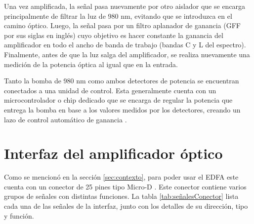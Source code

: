 
Una vez amplificada, la señal pasa nuevamente por otro aislador que se encarga principalmente de filtrar la luz de 980 nm, evitando que se introduzca en el camino óptico. Luego, la señal pasa por un filtro aplanador de ganancia (GFF por sus siglas en inglés) cuyo objetivo es hacer constante la ganancia del amplificador en todo el ancho de banda de trabajo \citep{WEBSITE:EDFA3} (bandas C y L del espectro). Finalmente, antes de que la luz salga del amplificador, se realiza nuevamente una medición de la potencia óptica al igual que en la entrada.

Tanto la bomba de 980 nm como ambos detectores de potencia se encuentran conectados a una unidad de control. Esta generalmente cuenta con un microcontrolador o chip dedicado que se encarga de regular la potencia que entrega la bomba en base a los valores medidos por los detectores, creando un lazo de control automático de ganancia \citep{WEBSITE:EDFA2}\citep{WEBSITE:EDFA1}.

\section{Interfaz del amplificador óptico}
\label{sec:intAmp}

Como se mencionó en la sección \ref{sec:contexto}, para poder usar el EDFA este cuenta con un conector de 25 pines tipo Micro-D \citep{WEBSITE:MICROD_DS}. Este conector contiene varios grupos de señales con distintas funciones. La tabla \ref{tab:señalesConector} lista cada una de las señales de la interfaz, junto con los detalles de su dirección, tipo y función.

